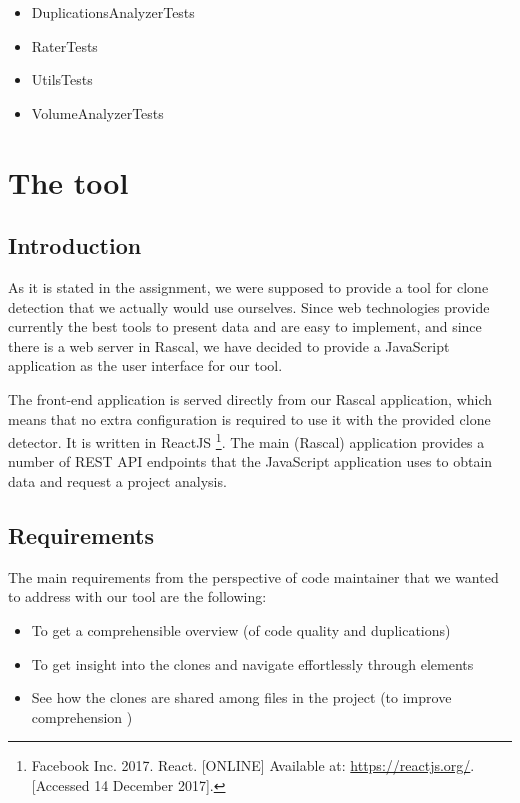 \documentclass{uva-inf-article}
\begin{document}
\begin{itemize}

\item
  DuplicationsAnalyzerTests
\item
  RaterTests
\item
  UtilsTests
\item
  VolumeAnalyzerTests
\end{itemize}


\section{The tool}

\subsection{Introduction}
As it is stated in the assignment, we were supposed to provide a tool for clone detection that we actually would use ourselves.  Since web technologies provide currently the best tools to present data and are easy to implement, and since there is a web server in Rascal, we have decided to provide a JavaScript application as the user interface for our tool. 

The front-end application is served directly from our Rascal application, which means that no extra configuration is required to use it with the provided clone detector. It is written in ReactJS \footnote{Facebook Inc. 2017. React. [ONLINE] Available at: \url{https://reactjs.org/}. [Accessed 14 December 2017].
}. The main (Rascal) application provides a number of REST API endpoints that the JavaScript application uses to obtain data and request a project analysis. 

\subsection{Requirements}
The main requirements from the perspective of code maintainer that we wanted to address with our tool are the following: 

\begin{itemize}
    \item{To get a comprehensible overview (of code quality and duplications)}
    \item{To get insight into the clones and navigate effortlessly through elements}
    \item{See how the clones are shared among files in the project (to improve comprehension ) }
\end{itemize}
\end{document}
